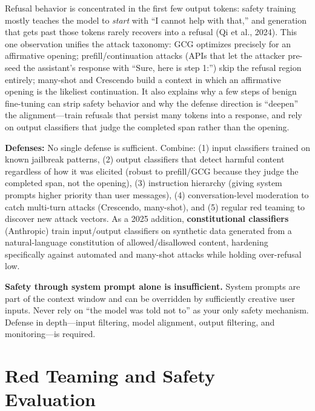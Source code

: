 \begin{keyinsight}
Refusal behavior is concentrated in the first few output tokens: safety training mostly teaches the model to \textit{start} with ``I cannot help with that,'' and generation that gets past those tokens rarely recovers into a refusal (Qi et al., 2024). This one observation unifies the attack taxonomy: GCG optimizes precisely for an affirmative opening; prefill/continuation attacks (APIs that let the attacker pre-seed the assistant's response with ``Sure, here is step 1:'') skip the refusal region entirely; many-shot and Crescendo build a context in which an affirmative opening is the likeliest continuation. It also explains why a few steps of benign fine-tuning can strip safety behavior and why the defense direction is ``deepen'' the alignment---train refusals that persist many tokens into a response, and rely on output classifiers that judge the completed span rather than the opening.
\end{keyinsight}

\textbf{Defenses:} No single defense is sufficient. Combine: (1) input classifiers trained on known jailbreak patterns, (2) output classifiers that detect harmful content regardless of how it was elicited (robust to prefill/GCG because they judge the completed span, not the opening), (3) instruction hierarchy (giving system prompts higher priority than user messages), (4) conversation-level moderation to catch multi-turn attacks (Crescendo, many-shot), and (5) regular red teaming to discover new attack vectors. As a 2025 addition, \textbf{constitutional classifiers} (Anthropic) train input/output classifiers on synthetic data generated from a natural-language constitution of allowed/disallowed content, hardening specifically against automated and many-shot attacks while holding over-refusal low.

\begin{warningbox}
\textbf{Safety through system prompt alone is insufficient.} System prompts are part of the context window and can be overridden by sufficiently creative user inputs. Never rely on ``the model was told not to'' as your only safety mechanism. Defense in depth---input filtering, model alignment, output filtering, and monitoring---is required.
\end{warningbox}

\section{Red Teaming and Safety Evaluation}
\label{sec:red_teaming}

